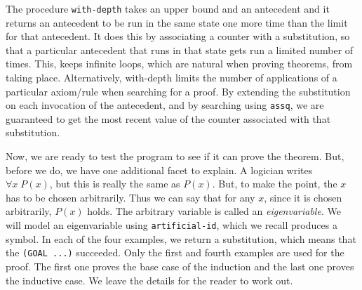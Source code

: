 The procedure \texttt{with-depth} takes an upper bound and an
antecedent and it returns an antecedent to be run in the same state
one more time than the limit for that antecedent.  It does this by
associating a counter with a substitution, so that a particular
antecedent that runs in that state gets run a limited number of times.
This, keeps infinite loops, which are natural when proving theorems,
from taking place.  Alternatively, with-depth limits the number of
applications of a particular axiom/rule when searching for a proof.
By extending the substitution on each invocation of the antecedent,
and by searching using \texttt{assq}, we are guaranteed to get the
most recent value of the counter associated with that substitution.

Now, we are ready to test the program to see if it can prove the
theorem.  But, before we do, we have one additional facet to explain.
A logician writes $\forall x \; P(x)$, but this is really the same as
$P(x)$.  But, to make the point, the $x$ has to be chosen arbitrarily.
Thus we can say that for any $x$, since it is chosen arbitrarily,
$P(x)$ holds.  The arbitrary variable is called an \emph{eigenvariable}.
We will model an eigenvariable using \texttt{artificial-id}, which we
recall produces a symbol.  In each of the four examples, we return a
substitution, which means that the \texttt{(GOAL ...)} succeeded.
Only the first and fourth examples are used for the proof.  The first
one proves the base case of the induction and the last one proves the
inductive case.  We leave the details for the reader to work out.

